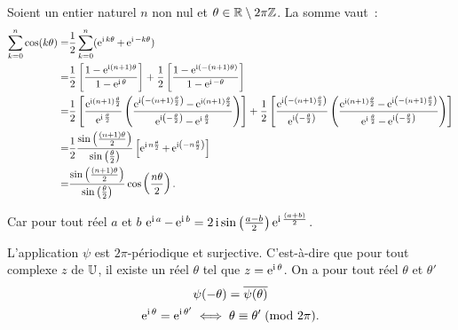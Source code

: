 Soient un entier naturel \(n\) non nul et \(\theta \in \mathbb{R} \setminus 2\pi\mathbb{Z}\). La 
somme vaut~:
\begin{align*}
  \sum_{k = 0}^n \cos(k\theta)  = & \frac{1}{2} \sum_{k = 0}^n (\operatorname{e}^{\operatorname{i} k 
  \theta} + \operatorname{e}^{\operatorname{i} -k \theta})\\
    = &\frac{1}{2} \left[\frac{1-\operatorname{e}^{\operatorname{i} (n + 
    1) \theta}}{1-\operatorname{e}^{\operatorname{i} \theta}} \right] + \frac{1}{2} 
    \left[ \frac{1-\operatorname{e}^{\operatorname{i} (-(n + 1)\theta)}}{1-\operatorname{e}^{\operatorname{i} -\theta}} \right]\\
          = &\frac{1}{2} \left[ \frac{\operatorname{e}^{\operatorname{i} (n + 1) 
                \frac{\theta}{2}}}{\operatorname{e}^{\operatorname{i} \frac{\theta}{2}}} \left( \frac{\operatorname{e}^{\operatorname{i} \left( 
                -(n + 1) \frac{\theta}{2} \right)} - \operatorname{e}^{\operatorname{i} (n + 1) 
              \frac{\theta}{2}}}{\operatorname{e}^{\operatorname{i} \left( -\frac{\theta}{2} \right)} - 
        \operatorname{e}^{\operatorname{i} \frac{\theta}{2}}} \right) \right] \notag + \frac{1}{2} \left[ 
        \frac{\operatorname{e}^{\operatorname{i} \left( -(n + 1) \frac{\theta}{2} \right)}}{\operatorname{e}^{\operatorname{i} \left( 
            -\frac{\theta}{2} \right)}} \left( \frac{\operatorname{e}^{\operatorname{i} (n + 1) 
            \frac{\theta}{2}}-\operatorname{e}^{\operatorname{i} \left( -(n + 1) \frac{\theta}{2} 
              \right)}}{\operatorname{e}^{\operatorname{i} \frac{\theta}{2}} - \operatorname{e}^{\operatorname{i} \left( -\frac{\theta}{2} 
          \right)}} \right) \right] \\
                = & \frac{1}{2} \frac{\sin \left( \frac{(n + 1)\theta}{2} \right)}{\sin 
                  \left( \frac{\theta}{2} \right)} \left[ \operatorname{e}^{\operatorname{i} n \frac{\theta}{2}} + 
                \operatorname{e}^{\operatorname{i} \left( -n \frac{\theta}{2} \right)} \right] \\
                  = & \frac{\sin \left( \frac{(n + 1)\theta}{2} \right)}{\sin \left( 
                  \frac{\theta}{2} \right)} \cos \left( \frac{n\theta}{2} \right).
                    \end{align*}

                    Car pour tout réel \(a\) et \(b\) \(\operatorname{e}^{\operatorname{i} a}-\operatorname{e}^{\operatorname{i} b} = 2\operatorname{i} 
                    \sin\left(\frac{a-b}{2}\right)\operatorname{e}^{\operatorname{i} \frac{(a + b)}{2}}\).

                    \begin{prop}
                      L'application \(\psi\) est  \(2\pi\)-périodique et surjective. C'est-à-dire 
                      que pour tout complexe \(z\) de \(\mathbb{U}\), il existe un réel \(\theta\) tel que 
                      \(z = \operatorname{e}^{\operatorname{i} \theta}\). On a pour tout réel \(\theta\) et \(\theta'\)
                      \begin{gather}
                        \psi(-\theta) = \overline{\psi(\theta)}\\
                        \operatorname{e}^{\operatorname{i} \theta} = \operatorname{e}^{\operatorname{i} \theta'} \iff \theta \equiv \theta'\!\pmod {2\pi}.
                      \end{gather}
                    \end{prop}

